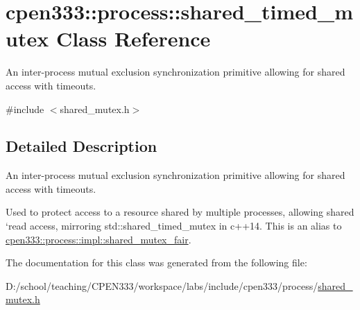 \hypertarget{classcpen333_1_1process_1_1shared__timed__mutex}{}\section{cpen333\+:\+:process\+:\+:shared\+\_\+timed\+\_\+mutex Class Reference}
\label{classcpen333_1_1process_1_1shared__timed__mutex}


An inter-\/process mutual exclusion synchronization primitive allowing for shared access with timeouts.  




{\ttfamily \#include $<$shared\+\_\+mutex.\+h$>$}



\subsection{Detailed Description}
An inter-\/process mutual exclusion synchronization primitive allowing for shared access with timeouts. 

Used to protect access to a resource shared by multiple processes, allowing shared `read\textquotesingle{} access, mirroring std\+::shared\+\_\+timed\+\_\+mutex in c++14. This is an alias to \hyperlink{classcpen333_1_1process_1_1impl_1_1shared__mutex__fair}{cpen333\+::process\+::impl\+::shared\+\_\+mutex\+\_\+fair}. 

The documentation for this class was generated from the following file\+:\begin{DoxyCompactItemize}
\item 
D\+:/school/teaching/\+C\+P\+E\+N333/workspace/labs/include/cpen333/process/\hyperlink{process_2shared__mutex_8h}{shared\+\_\+mutex.\+h}\end{DoxyCompactItemize}
